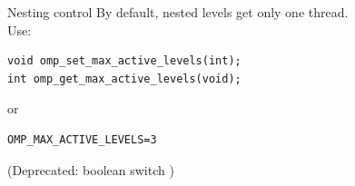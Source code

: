 \begin{numberedframe}{Nesting control}
  By default, nested levels get only one thread.\\
  Use:
\begin{lstlisting}
void omp_set_max_active_levels(int);
int omp_get_max_active_levels(void);
\end{lstlisting}
or 
\begin{lstlisting}[language=shell]
OMP_MAX_ACTIVE_LEVELS=3
\end{lstlisting}
(Deprecated: boolean switch )
\end{numberedframe}

\endinput

\begin{numberedframe}{}
\begin{lstlisting}
\end{lstlisting}
\begin{itemize}
\item
\end{itemize}
\end{numberedframe}

